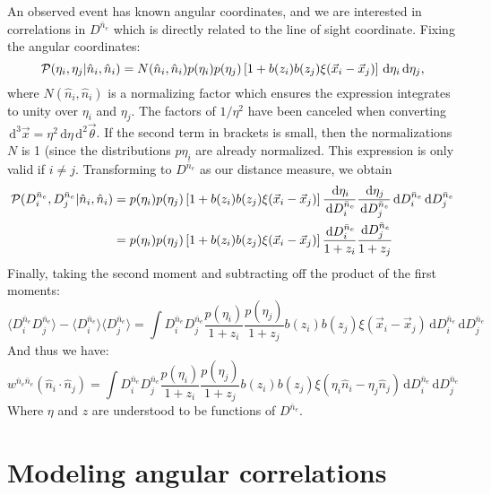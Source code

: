 \documentclass[onecolumn,prd,noshowpacs,nofootinbib,amsmath,amssymb]{revtex4}
\newcommand{\Dne}{D^{\bar{n}_e}}
\newcommand{\calP}{{\cal P}}
\newcommand{\ud}{\,\mathrm{d}}
\begin{document}
An observed event has known angular coordinates, and we are interested in
correlations in $\Dne$ which is directly related to the line of sight
coordinate.  Fixing the angular coordinates:
\begin{equation}
    \calP(\eta_i, \eta_j | \hat{n}_i, \hat{n}_i) = N(\hat{n}_i, \hat{n}_i)
    p(\eta_i)p(\eta_j) \left[ 1 + b(z_i)
    b(z_j) \xi(\vec x_i - \vec x_j) \right] \ud \eta_i \ud \eta_j,
\end{equation}
where $N(\hat{n}_i, \hat{n}_i)$ is a normalizing factor which ensures the
expression integrates to unity over $\eta_i$ and $\eta_j$. The factors of
$1/\eta^2$ have been canceled when converting $\ud^3 \vec x = \eta^2 \ud \eta \ud^2
\vec \theta$. If the second term in brackets is small, then the normalizations
$N$ is 1 (since the distributions $p{\eta_i}$ are already normalized. 
This expression is
only valid if $i \ne j$.
Transforming to $\Dne$ as our distance measure, we obtain
\begin{align}
\calP(\Dne_i, \Dne_j | \hat{n}_i, \hat{n}_i)
    &= p(\eta_i)p(\eta_j) \left[ 1 + b(z_i)
        b(z_j) \xi(\vec x_i - \vec x_j) \right]
        \frac{\ud \eta_i}{\ud \Dne_i} \frac{\ud \eta_j}{\ud \Dne_j}
        \ud \Dne_i\ud \Dne_j
        \\
    &= p(\eta_i)p(\eta_j) \left[ 1 + b(z_i)
        b(z_j) \xi(\vec x_i - \vec x_j) \right]
        \frac{\ud \Dne_i}{1 + z_i}\frac{\ud \Dne_j}{1 + z_j}
\end{align}
Finally, taking the second moment and subtracting off the product of the first
moments:
\begin{equation}
\langle \Dne_i \Dne_j \rangle
    - \langle \Dne_i \rangle \langle \Dne_j \rangle =
    \int \Dne_i \Dne_j
    \frac{p(\eta_i)}{1 + z_i}\frac{p(\eta_j)}{1 + z_j}
    b(z_i) b(z_j) \xi(\vec x_i - \vec x_j)
        \ud \Dne_i\ud \Dne_j
\end{equation}
And thus we have:
\begin{equation}
    w^{\bar{n}_e \bar{n}_e}(\hat{n}_i\cdot\hat{n}_j)
        =\int \Dne_i \Dne_j
    \frac{p(\eta_i)}{1 + z_i}\frac{p(\eta_j)}{1 + z_j}
    b(z_i) b(z_j) \xi(\eta_i \hat{n}_i - \eta_j \hat{n}_j)
        \ud \Dne_i\ud \Dne_j
\end{equation}
Where $\eta$ and $z$ are understood to be functions of $\Dne$.



\section{Modeling angular correlations}
\end{document}
